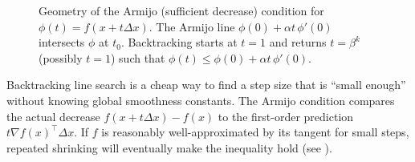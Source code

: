 \begin{figure}[t]
  \centering
  
  \caption{Geometry of the Armijo (sufficient decrease) condition for $\phi(t)=f(x+t\Delta x)$.
  The Armijo line $\phi(0)+\alpha t\,\phi'(0)$ intersects $\phi$ at $t_0$.
  Backtracking starts at $t=1$ and returns $t=\beta^k$ (possibly $t=1$) such that $\phi(t)\le \phi(0)+\alpha t\,\phi'(0)$.
  }
  \label{fig:armijo-backtracking}
\end{figure}

Backtracking line search is a cheap way to find a step size that is ``small enough'' without knowing global smoothness constants.
The Armijo condition compares the actual decrease $f(x+t\Delta x)-f(x)$ to the first-order prediction $t\nabla f(x)^\top \Delta x$.
If $f$ is reasonably well-approximated by its tangent for small steps, repeated shrinking will eventually make the inequality hold (see \citet[\S9.2]{boyd_vandenberghe_2004_convex}).
